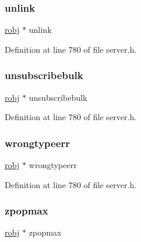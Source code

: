 \subsubsection{\texorpdfstring{unlink}{unlink}}
{\footnotesize\ttfamily \hyperlink{server_8h_a540f174d2685422fbd7d12e3cd44c8e2}{robj} $\ast$ unlink}



Definition at line 780 of file server.\+h.

\mbox{\label{structshared_objects_struct_ac72519418e62af0eef5f9a568b956504}} 
\subsubsection{\texorpdfstring{unsubscribebulk}{unsubscribebulk}}
{\footnotesize\ttfamily \hyperlink{server_8h_a540f174d2685422fbd7d12e3cd44c8e2}{robj} $\ast$ unsubscribebulk}



Definition at line 780 of file server.\+h.

\mbox{\label{structshared_objects_struct_a72d93f8c752cbe76e225113137ac21ec}} 
\subsubsection{\texorpdfstring{wrongtypeerr}{wrongtypeerr}}
{\footnotesize\ttfamily \hyperlink{server_8h_a540f174d2685422fbd7d12e3cd44c8e2}{robj} $\ast$ wrongtypeerr}



Definition at line 780 of file server.\+h.

\mbox{\label{structshared_objects_struct_ac83914f3396175fb89619333b752fc41}} 
\subsubsection{\texorpdfstring{zpopmax}{zpopmax}}
{\footnotesize\ttfamily \hyperlink{server_8h_a540f174d2685422fbd7d12e3cd44c8e2}{robj} $\ast$ zpopmax}



